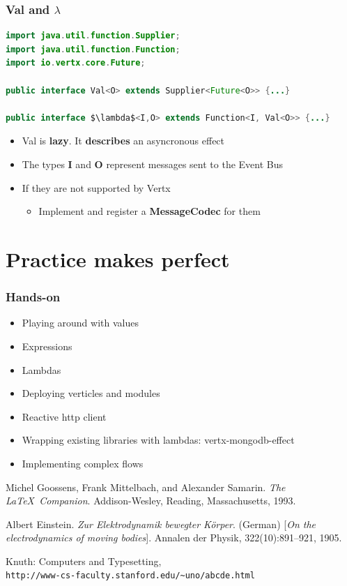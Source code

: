 \documentclass{beamer}
\begin{document}
\begin{frame}[fragile] 
\frametitle{Val and $\lambda$ }
\begin{lstlisting}[language=Java,numbers=none,mathescape=true]
import java.util.function.Supplier;
import java.util.function.Function;
import io.vertx.core.Future;

public interface Val<O> extends Supplier<Future<O>> {...}

public interface $\lambda$<I,O> extends Function<I, Val<O>> {...}

\end{lstlisting}

\clearpage

\begin{itemize}
 \item<1->  Val is \textbf{lazy}. It \textbf{describes} an asyncronous effect
 \item<2-> The types \textbf{I} and \textbf{O} represent messages sent to the Event Bus 
 \item<3-> If they are not supported by Vertx
       \begin{itemize}
        \item<4-> Implement and register a \textbf{MessageCodec} for them
      \end{itemize}
 \end{itemize}

\end{frame}


\section{Practice makes perfect}

\begin{frame}
\frametitle{Hands-on}
\begin{itemize}
\item<1->  Playing around with values
\item<2->  Expressions
\item<3->  Lambdas
\item<4->  Deploying verticles and modules
\item<5->  Reactive http client
\item<6->  Wrapping existing libraries with lambdas: vertx-mongodb-effect
\item<7->  Implementing complex flows
\end{itemize}

\end{frame}

\begin{thebibliography}{9}
Michel Goossens, Frank Mittelbach, and Alexander Samarin. 
\textit{The \LaTeX\ Companion}. 
Addison-Wesley, Reading, Massachusetts, 1993.

Albert Einstein. 
\textit{Zur Elektrodynamik bewegter K{\"o}rper}. (German) [\textit{On the electrodynamics of moving bodies}]. 
Annalen der Physik, 322(10):891–921, 1905.

Knuth: Computers and Typesetting,
\\\texttt{http://www-cs-faculty.stanford.edu/\~{}uno/abcde.html}
\end{thebibliography}
\end{document}
